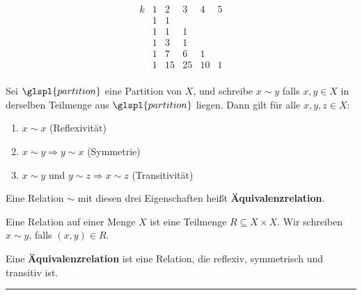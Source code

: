 \documentclass[9pt]{article}
\begin{document}
\[
\begin{array}{ccccccc}
k& 1 & 2 & 3 & 4 & 5 \\
&1 & 1 \\
&1 & 1 & 1 \\
&1 & 3 & 1 \\
&1 & 7 & 6 & 1 \\
&1 & 15 & 25 & 10 & 1 \\
\end{array}
\]

Sei \( \glspl{partition} \) eine Partition von \( X \), und schreibe \( x \sim y \) falls \( x, y \in X \) in derselben Teilmenge aus \( \glspl{partition} \) liegen. Dann gilt für alle \( x, y, z \in X \):

\begin{enumerate}
    \item \( x \sim x \) (Reflexivität)
    \item \( x \sim y \Rightarrow y \sim x \) (Symmetrie)
    \item \( x \sim y \) und \( y \sim z \Rightarrow x \sim z \) (Transitivität)
\end{enumerate}

Eine Relation \( \sim \) mit diesen drei Eigenschaften heißt \textbf{Äquivalenzrelation}. 

\begin{defi}
Eine Relation auf einer Menge \( X \) ist eine Teilmenge \( R \subseteq X \times X \). Wir schreiben \( x \sim y \), falls \( (x, y) \in R \).

Eine \textbf{Äquivalenzrelation} ist eine Relation, die reflexiv, symmetrisch und transitiv ist.
\end{defi} \noindent \rule{8cm}{0.4pt}
\end{document}
